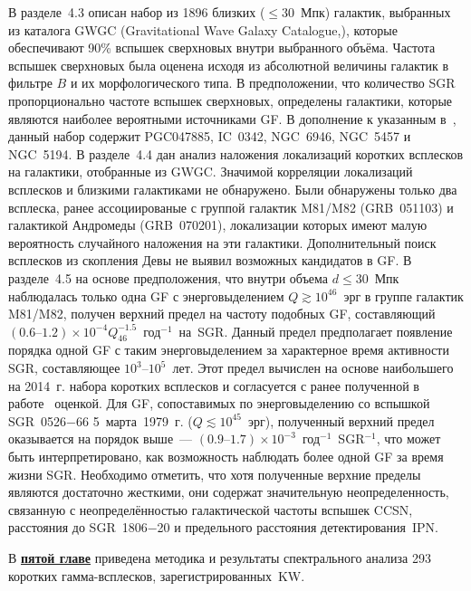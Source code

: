 В разделе~4.3 описан набор из 1896 близких ($\le 30$~Мпк) галактик, 
выбранных из каталога GWGC (Gravitational Wave Galaxy Catalogue,\citep{White2011CQGra}),
которые обеспечивают 90\% вспышек сверхновых внутри выбранного объёма.
Частота вспышек сверхновых была оценена исходя из абсолютной величины галактик 
в фильтре $B$ и их морфологического типа. 
В предположении, что количество SGR пропорционально частоте вспышек сверхновых, 
определены галактики, которые являются наиболее вероятными источниками GF. 
В дополнение к указанным в~\citep{Popov2006}, 
данный набор содержит PGC047885, IC~0342, NGC~6946, NGC~5457 и NGC~5194.
В разделе~4.4 дан анализ наложения 
локализаций коротких всплесков на галактики, отобранные из GWGC. Значимой 
корреляции локализаций всплесков и близкими галактиками не обнаружено. 
Были обнаружены только два всплеска, ранее ассоциированые 
с группой галактик M81/M82 (GRB~051103) и галактикой Андромеды (GRB~070201),
локализации которых имеют малую вероятность случайного наложения на эти галактики.
Дополнительный поиск всплесков из скопления Девы не выявил возможных кандидатов в GF.
В разделе~4.5 на основе предположения, что внутри объема $d \le 30$~Мпк наблюдалась 
только одна GF с энерговыделением $Q \gtrsim 10^{46}$~эрг в группе галактик M81/M82, 
получен верхний предел на частоту подобных GF, составляющий 
${(0.6\textrm{--}1.2)\times 10^{-4} Q_{46}^{-1.5}}$~год$^{-1}$~на~SGR.  
Данный предел предполагает появление порядка одной GF с таким энерговыделением 
за  характерное время активности SGR, составляющее $10^3\textrm{--}10^5$~лет. 
Этот предел вычислен на основе наибольшего на 2014~г.  
набора коротких всплесков и согласуется с ранее полученной в работе~\citep{Ofek_2007ApJ} оценкой. 
Для GF, сопоставимых по энерговыделению со вспышкой SGR~0526$-$66 5~марта~1979~г. ($Q \lesssim 10^{45}$~эрг), 
полученный верхний предел оказывается на порядок выше~--- $(0.9\textrm{--}1.7)\times 10^{-3}$~год$^{-1}$~SGR$^{-1}$,  
что может быть интерпретировано, как возможность наблюдать более одной GF за время жизни SGR.
Необходимо отметить, что хотя полученные верхние пределы являются достаточно жесткими, 
они содержат значительную неопределенность, связанную с
неопределённостью галактической частоты вспышек CCSN, расстояния до SGR~1806$-$20 и
предельного расстояния детектирования~IPN.

В \underline{\textbf{пятой главе}} приведена методика и результаты спектрального 
анализа 293 коротких гамма-всплесков, зарегистрированных~KW.

